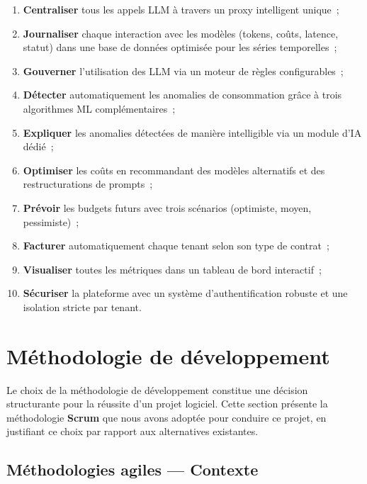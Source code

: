 \begin{enumerate}[noitemsep]
    \item \textbf{Centraliser} tous les appels LLM à travers un proxy intelligent unique~;
    \item \textbf{Journaliser} chaque interaction avec les modèles (tokens, coûts, latence, statut) dans une base de données optimisée pour les séries temporelles~;
    \item \textbf{Gouverner} l'utilisation des LLM via un moteur de règles configurables~;
    \item \textbf{Détecter} automatiquement les anomalies de consommation grâce à trois algorithmes ML complémentaires~;
    \item \textbf{Expliquer} les anomalies détectées de manière intelligible via un module d'IA dédié~;
    \item \textbf{Optimiser} les coûts en recommandant des modèles alternatifs et des restructurations de prompts~;
    \item \textbf{Prévoir} les budgets futurs avec trois scénarios (optimiste, moyen, pessimiste)~;
    \item \textbf{Facturer} automatiquement chaque tenant selon son type de contrat~;
    \item \textbf{Visualiser} toutes les métriques dans un tableau de bord interactif~;
    \item \textbf{Sécuriser} la plateforme avec un système d'authentification robuste et une isolation stricte par tenant.
\end{enumerate}


\section{Méthodologie de développement}
\label{sec:methodologie}

Le choix de la méthodologie de développement constitue une décision structurante pour la réussite d'un projet logiciel. Cette section présente la méthodologie \textbf{Scrum} que nous avons adoptée pour conduire ce projet, en justifiant ce choix par rapport aux alternatives existantes.

\subsection{Méthodologies agiles --- Contexte}

